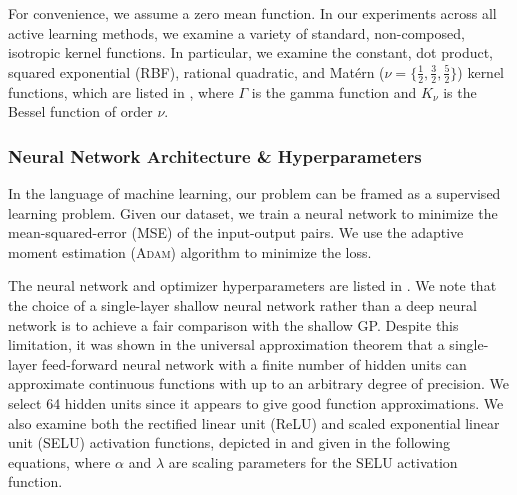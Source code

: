 \documentclass[conference,final]{IEEEtran}
\begin{document}
	For convenience, we assume a zero mean function. In our experiments across all active learning methods, we examine a variety of standard, non-composed, isotropic kernel functions. In particular, we examine the constant, dot product, squared exponential (RBF), rational quadratic, and Mat\'ern ($\nu = \{\tfrac{1}{2}, \tfrac{3}{2}, \tfrac{5}{2}\}$) kernel functions, which are listed in , where $\Gamma$ is the gamma function and $K_\nu$ is the Bessel function of order $\nu$. 
	
	\subsubsection{Neural Network Architecture \& Hyperparameters}
	
	In the language of machine learning, our problem can be framed as a supervised learning problem. Given our dataset, we train a neural network to minimize the mean-squared-error (MSE) of the input-output pairs. We use the adaptive moment estimation (\textsc{Adam}) algorithm to minimize the loss. 
	
	The neural network and optimizer hyperparameters are listed in . We note that the choice of a single-layer shallow neural network rather than a deep neural network is to achieve a fair comparison with the shallow GP. Despite this limitation, it was shown in the universal approximation theorem \cite{Cybenko1989ApproximationFunction} that a single-layer feed-forward neural network with a finite number of hidden units can approximate continuous functions with up to an arbitrary degree of precision. We select 64 hidden units since it appears to give good function approximations. We also examine both the rectified linear unit (ReLU) \cite{Nair2010RectifiedMachines} and scaled exponential linear unit (SELU) \cite{Klambauer2017Self-normalizingNetworks} activation functions, depicted in  and given in the following equations, where $\alpha$ and $\lambda$ are scaling parameters for the SELU activation function.
	
\end{document}
